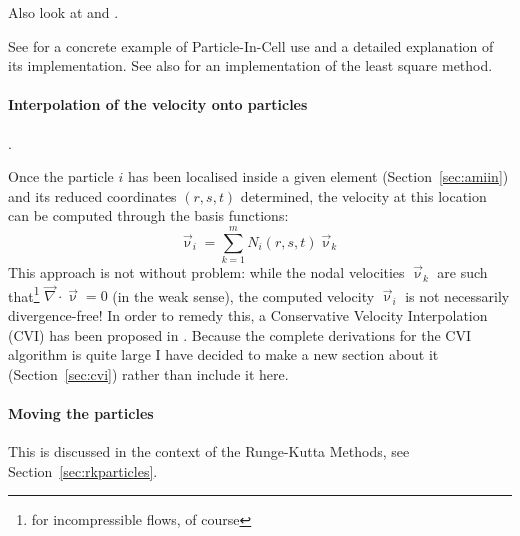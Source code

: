 Also look at \textcite{yamm21} and \textcite{bolc17}.


See  for a concrete example of Particle-In-Cell use and a detailed 
explanation of its implementation. See also  for an implementation of the 
least square method. 



\paragraph{Interpolation of the velocity onto particles}.

Once the particle $i$ has been localised inside a given element (Section~\ref{sec:amiin}) 
and its reduced coordinates $(r,s,t)$ determined, the velocity at this location can 
be computed through the basis functions:
\[
\vec\upnu_i=\sum_{k=1}^m N_i(r,s,t) \vec\upnu_k
\]
This approach is not without problem: while the nodal velocities $\vec\upnu_k$ are such 
that\footnote{for incompressible flows, of course} 
$\vec\nabla\cdot\vec\upnu=0$ (in the weak sense), the computed velocity $\vec\upnu_i$ 
is not necessarily divergence-free! In order to remedy this, a 
Conservative Velocity Interpolation (CVI) has been proposed in \cite{waav15}.
Because the complete derivations for the CVI algorithm is quite large I 
have decided to make a new section about it (Section~\ref{sec:cvi}) rather than include it 
here.

\paragraph{Moving the particles}

This is discussed in the context of the Runge-Kutta Methods, see Section~\ref{sec:rkparticles}.











